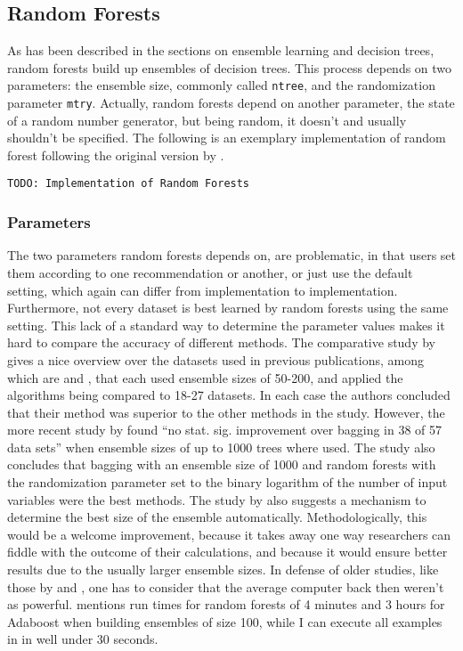 \documentclass[a4paper,man,12pt,apacite]{apa6} %
\begin{document}
\subsection{Random Forests}
As has been described in the sections on ensemble learning and decision trees,
random forests build up ensembles of decision trees.
This process depends on two parameters: the ensemble size, commonly called
\texttt{ntree}, and the randomization parameter \texttt{mtry}.
Actually, random forests depend on another parameter,
the state of a random number generator, but being random,
it doesn't and usually shouldn't be specified.
The following is an exemplary implementation of random forest following the
original version by \cite{breiman2001random}.

\begin{verbatim}
TODO: Implementation of Random Forests
\end{verbatim}

\subsubsection{Parameters}
The two parameters random forests depends on, are problematic,
in that users set them according to one recommendation or another,
or just use the default setting, which again can differ from implementation
to implementation.
Furthermore, not every dataset is best learned by random forests using the
same setting.
This lack of a standard way to determine the parameter values makes it hard
to compare the accuracy of different methods.
The comparative study by \cite{banfield2007comparison} gives a nice overview
over the datasets used in previous publications,
among which are \cite{breiman2001random} and \cite{dietterich2000ensemble},
that each used ensemble sizes of 50-200, and applied the algorithms being
compared to 18-27 datasets.
In each case the authors concluded that their method was superior to the
other methods in the study.
However, the more recent study by \cite{banfield2007comparison} found
“no stat. sig. improvement over bagging in 38 of 57 data sets”
when ensemble sizes of up to 1000 trees where used.
The study also concludes that bagging with an ensemble size of 1000 and
random forests with the randomization parameter set to the
binary logarithm of the number of input variables were the best methods.
The study by \cite{banfield2007comparison} also suggests a mechanism
to determine the best size of the ensemble automatically.
Methodologically, this would be a welcome improvement, because it takes
away one way researchers can fiddle with the outcome of their calculations,
and because it would ensure better results due to the usually larger
ensemble sizes.
In defense of older studies, like those by \cite{breiman2001random} and
\cite{dietterich2000ensemble}, one has to consider that the average
computer back then weren't as powerful.
\cite{breiman2001random} mentions run times for random forests of 4 minutes
and 3 hours for Adaboost when building ensembles of size 100,
while I can execute all examples in \cite{strobl2009introduction}
in well under 30 seconds.
\end{document}
